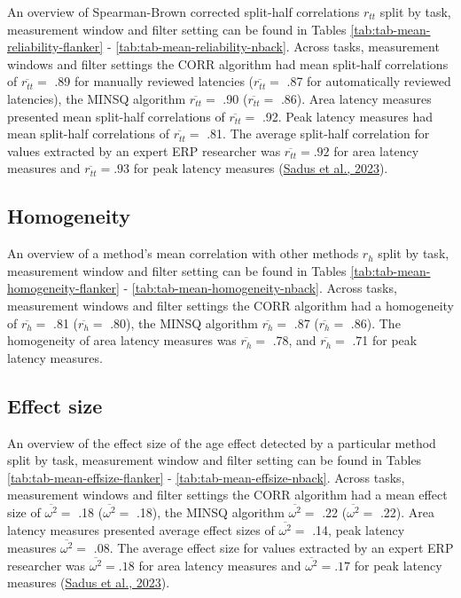 \documentclass[
  man]{apa7}
\begin{document}
An overview of Spearman-Brown corrected split-half correlations \(r_{tt}\) split by task, measurement window and filter setting can be found in Tables \ref{tab:tab-mean-reliability-flanker} - \ref{tab:tab-mean-reliability-nback}. Across tasks, measurement windows and filter settings the CORR algorithm had mean split-half correlations of \(\overline{r_{tt}} =\) .89 for manually reviewed latencies (\(\overline{r_{tt}} =\) .87 for automatically reviewed latencies), the MINSQ algorithm \(\overline{r_{tt}} =\) .90 (\(\overline{r_{tt}} =\) .86). Area latency measures presented mean split-half correlations of \(\overline{r_{tt}} =\) .92. Peak latency measures had mean split-half correlations of \(\overline{r_{tt}} =\) .81. The average split-half correlation for values extracted by an expert ERP researcher was \(\overline{r_{tt}} = .92\) for area latency measures and \(\overline{r_{tt}} = .93\) for peak latency measures (\protect\hyperlink{ref-sadus2023multiverse}{Sadus et al., 2023}).

\hypertarget{homogeneity}{%
\subsection{Homogeneity}\label{homogeneity}}

An overview of a method's mean correlation with other methods \(r_h\) split by task, measurement window and filter setting can be found in Tables \ref{tab:tab-mean-homogeneity-flanker} - \ref{tab:tab-mean-homogeneity-nback}. Across tasks, measurement windows and filter settings the CORR algorithm had a homogeneity of \(\overline{r_{h}} =\) .81 (\(\overline{r_{h}} =\) .80), the MINSQ algorithm \(\overline{r_{h}} =\) .87 (\(\overline{r_{h}} =\) .86). The homogeneity of area latency measures was \(\overline{r_{h}} =\) .78, and \(\overline{r_{h}} =\) .71 for peak latency measures.

\hypertarget{effect-size}{%
\subsection{Effect size}\label{effect-size}}

An overview of the effect size of the age effect detected by a particular method split by task, measurement window and filter setting can be found in Tables \ref{tab:tab-mean-effsize-flanker} - \ref{tab:tab-mean-effsize-nback}. Across tasks, measurement windows and filter settings the CORR algorithm had a mean effect size of \(\overline{\omega^2} =\) .18 (\(\overline{\omega^2} =\) .18), the MINSQ algorithm \(\overline{\omega^2} =\) .22 (\(\overline{\omega^2} =\) .22). Area latency measures presented average effect sizes of \(\overline{\omega^2} =\) .14, peak latency measures \(\overline{\omega^2} =\) .08. The average effect size for values extracted by an expert ERP researcher was \(\overline{\omega^2} = .18\) for area latency measures and \(\overline{\omega^2} = .17\) for peak latency measures (\protect\hyperlink{ref-sadus2023multiverse}{Sadus et al., 2023}).
\end{document}
